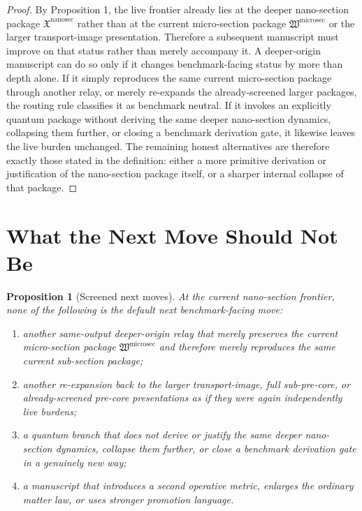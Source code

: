 \documentclass[11pt]{article}
\newcommand{\MicroSectionPackage}{\mathfrak W^{\mathrm{microsec}}}
\newcommand{\NanoSectionPackage}{\mathfrak X^{\mathrm{nanosec}}}
\newtheorem{proposition}{Proposition}
\begin{document}
\begin{proof}
By Proposition 1, the live frontier already lies at the deeper nano-section package \(\NanoSectionPackage\) rather than at the current micro-section package \(\MicroSectionPackage\) or the larger transport-image presentation. Therefore a subsequent manuscript must improve on that status rather than merely accompany it. A deeper-origin manuscript can do so only if it changes benchmark-facing status by more than depth alone. If it simply reproduces the same current micro-section package through another relay, or merely re-expands the already-screened larger packages, the routing rule classifies it as benchmark neutral. If it invokes an explicitly quantum package without deriving the same deeper nano-section dynamics, collapsing them further, or closing a benchmark derivation gate, it likewise leaves the live burden unchanged. The remaining honest alternatives are therefore exactly those stated in the definition: either a more primitive derivation or justification of the nano-section package itself, or a sharper internal collapse of that package.
\end{proof}

\section{What the Next Move Should Not Be}

\begin{proposition}[Screened next moves]
At the current nano-section frontier, none of the following is the default next benchmark-facing move:
\begin{enumerate}
    \item another same-output deeper-origin relay that merely preserves the current micro-section package \(\MicroSectionPackage\) and therefore merely reproduces the same current sub-section package;
    \item another re-expansion back to the larger transport-image, full sub-pre-core, or already-screened pre-core presentations as if they were again independently live burdens;
    \item a quantum branch that does not derive or justify the same deeper nano-section dynamics, collapse them further, or close a benchmark derivation gate in a genuinely new way;
    \item a manuscript that introduces a second operative metric, enlarges the ordinary matter law, or uses stronger promotion language.
\end{enumerate}
\end{proposition}
\end{document}
